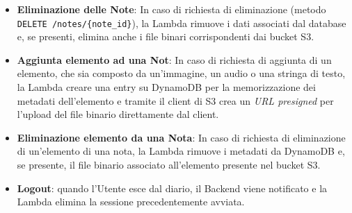 \documentclass[a4paper,12pt]{article}
\begin{document}
\begin{itemize}
    \item \textbf{Eliminazione delle Note}: In caso di richiesta di eliminazione (metodo \texttt{DELETE /notes/\{note\_id\}}), la Lambda rimuove i dati associati dal database e, se presenti, elimina anche i file binari corrispondenti dai bucket S3.
    
    \item \textbf{Aggiunta elemento ad una Not}: In caso di richiesta di aggiunta di un elemento, che sia composto da un'immagine, un audio o una stringa di testo, la Lambda creare una entry su DynamoDB per la memorizzazione dei metadati dell'elemento e tramite il client di S3 crea un \textit{URL presigned} per l'upload del file binario direttamente dal client.

    \item \textbf{Eliminazione elemento da una Nota}: In caso di richiesta di eliminazione di un'elemento di una nota, la Lambda rimuove i metadati da DynamoDB e, se presente, il file binario associato all'elemento presente nel bucket S3.

    \item \textbf{Logout}: quando l'Utente esce dal diario, il Backend viene notificato e la Lambda elimina la sessione precedentemente avviata.
\end{itemize}
\end{document}
